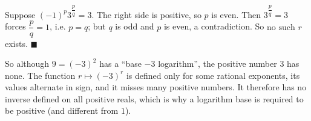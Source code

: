 Suppose $(-1)^p3^{\dfrac pq}=3$. The right side is positive, so $p$ is even. Then $3^{\dfrac pq}=3$ forces $\dfrac pq=1$, i.e. $p=q$; but $q$ is odd and $p$ is even, a contradiction. So $\boxed{\text{no such }r}$ exists. $\blacksquare$

So although $9=(-3)^2$ has a ``base $-3$ logarithm'', the positive number $3$ has none. The function $r\mapsto(-3)^r$ is defined only for some rational exponents, its values alternate in sign, and it misses many positive numbers. It therefore has no inverse defined on all positive reals, which is why a logarithm base is required to be positive (and different from $1$).
